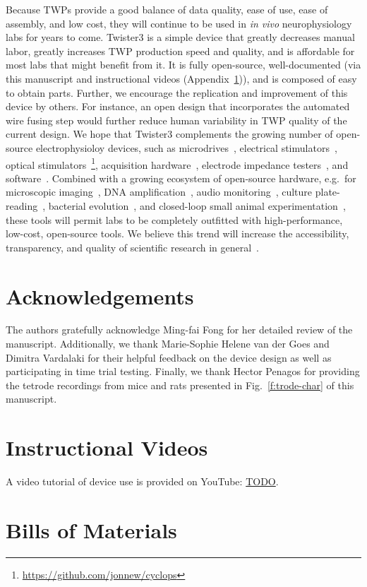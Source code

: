 \documentclass[11pt,a4paper]{article}
\begin{document}
Because TWPs provide a good balance of data quality, ease of use, ease of
assembly, and low cost, they will continue to be used in \textit{in vivo}
neurophysiology labs for years to come. Twister3 is a simple device that
greatly decreases manual labor, greatly increases TWP production speed and
quality, and is affordable for most labs that might benefit from it. It is
fully open-source, well-documented (via this manuscript and instructional
videos (Appendix~\ref{s:videos})), and is composed of easy to obtain parts.
Further, we encourage the replication and improvement of this device by others.
For instance, an open design that incorporates the automated wire fusing step
would further reduce human variability in TWP quality of the current design. We
hope that Twister3 complements the growing number of open-source
electrophysioloy devices, such as
microdrives~\cite{Kloosterman2009,Voigts2013}, electrical
stimulators~\cite{Cermac2019}, optical
stimulators~\cite{Newman2015}\footnote{\url{https://github.com/jonnew/cyclops}},
acquisition hardware~\cite{Siegle2017}, electrode impedance
testers~\cite{Matsumoto2019}, and software~\cite{Newman2012b, Siegle2017,
Lopes2015}. Combined with a growing ecosystem of open-source hardware, e.g.\
for microscopic imaging~\cite{Cai2016,Voigt2019,MIMMS}, DNA
amplification~\cite{OpenPCR}, audio monitoring~\cite{Hill2018}, culture
plate-reading~\cite{Szymula2019}, bacterial evolution~\cite{Takahashi2015}, and
closed-loop small animal experimentation~\cite{Maia2017,Moreira2019}, these
tools will permit labs to be completely outfitted with high-performance,
low-cost, open-source tools. We believe this trend will increase the
accessibility, transparency, and quality of scientific research in
general~\cite{Siegle2015}.

\section*{Acknowledgements}
The authors gratefully acknowledge Ming-fai Fong for her detailed review of the
manuscript. Additionally, we thank Marie-Sophie Helene van der Goes and Dimitra
Vardalaki for their helpful feedback on the device design as well as
participating in time trial testing. Finally, we thank Hector Penagos for
providing the tetrode recordings from mice and rats presented in
Fig.~\ref{f:trode-char} of this manuscript.

\medskip




\newpage

\begin{appendices}

\section{Instructional Videos}\label{s:videos}

A video tutorial of device use is provided on YouTube: \url{TODO}.

\section{Bills of Materials}\label{s:boms}





\end{appendices}
\end{document}
